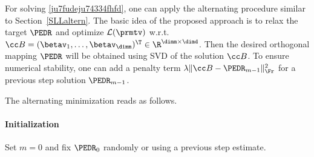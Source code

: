 \label{SaltMI}
For solving \eqref{ju7fudeju74334fhfd}, one can apply the alternating procedure similar to Section~\ref{SLLaltern}.
The basic idea of the proposed approach is to relax the target \( \PEDR \)
and optimize \( \LL(\prmtv) \) w.r.t. 
\( \BEDR = (\betav_{1},\ldots,\betav_{\dimm})^{\T} \in \R^{\dimm \times \dimd} \). 
Then the desired orthogonal mapping \( \PEDR \) will be obtained using SVD 
of the solution \( \BEDR \).
%
To ensure numerical stability, one can add a penalty term \( \lambda \| \BEDR - \PEDR_{m-1} \|_{\Fr}^{2} \)
for a previous step solution \( \PEDR_{m-1} \).

The alternating minimization reads as follows.
\paragraph{Initialization}
Set \( m=0 \) and fix
\( \PEDR_{0} \) randomly or using a previous step estimate.


